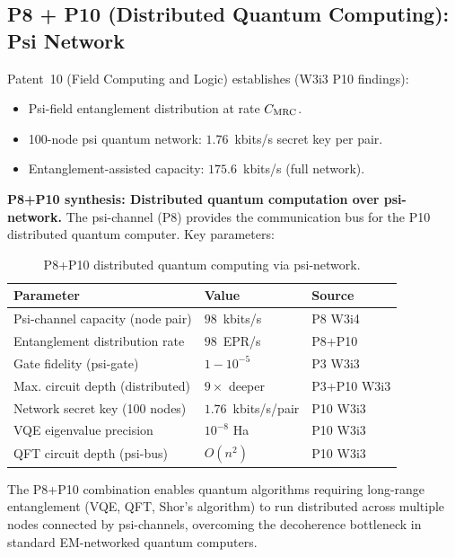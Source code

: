 \documentclass[aps,prd,twocolumn,superscriptaddress,nofootinbib]{revtex4-2}
\begin{document}
\subsection{P8 + P10 (Distributed Quantum Computing): Psi Network}

Patent~10 (Field Computing and Logic) establishes (W3i3 P10 findings):
\begin{itemize}
\item Psi-field entanglement distribution at rate $C_{\rm MRC}$.
\item 100-node psi quantum network: $1.76$~kbits/s secret key per pair.
\item Entanglement-assisted capacity: $175.6$~kbits/s (full network).
\end{itemize}

\textbf{P8+P10 synthesis: Distributed quantum computation over psi-network.}
The psi-channel (P8) provides the communication bus for the P10 distributed
quantum computer. Key parameters:

\begin{table}[h]
\centering
\caption{P8+P10 distributed quantum computing via psi-network.}
\begin{tabular}{lll}
\hline\hline
Parameter & Value & Source \\
\hline
Psi-channel capacity (node pair) & $98$~kbits/s & P8 W3i4 \\
Entanglement distribution rate & $98$~EPR/s & P8+P10 \\
Gate fidelity (psi-gate) & $1 - 10^{-5}$ & P3 W3i3 \\
Max. circuit depth (distributed) & $9\times$ deeper & P3+P10 W3i3 \\
Network secret key (100 nodes) & $1.76$~kbits/s/pair & P10 W3i3 \\
\hline
VQE eigenvalue precision & $10^{-8}$ Ha & P10 W3i3 \\
QFT circuit depth (psi-bus) & $O(n^2)$ & P10 W3i3 \\
\hline\hline
\end{tabular}
\label{tab:P8P10}
\end{table}

The P8+P10 combination enables quantum algorithms requiring long-range
entanglement (VQE, QFT, Shor's algorithm) to run distributed across
multiple nodes connected by psi-channels, overcoming the decoherence
bottleneck in standard EM-networked quantum computers.
\end{document}

